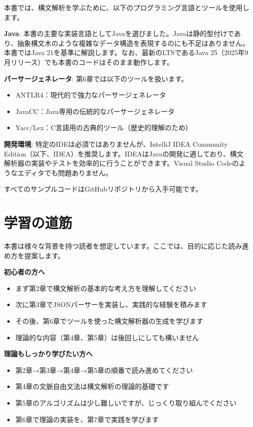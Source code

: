 本書では、構文解析を学ぶために、以下のプログラミング言語とツールを使用します。

\textbf{Java}:
本書の主要な実装言語としてJavaを選びました。Javaは静的型付けであり、抽象構文木のような複雑なデータ構造を表現するのにも不足はありません。本書ではJava
21を基準に解説します。なお、最新のLTSであるJava
25（2025年9月リリース）でも本書のコードはそのまま動作します。

\textbf{パーサージェネレータ}: 第6章では以下のツールを扱います。

\begin{itemize}
\tightlist
\item
  ANTLR4：現代的で強力なパーサージェネレータ
\item
  JavaCC：Java専用の伝統的なパーサージェネレータ
\item
  Yacc/Lex：C言語用の古典的ツール（歴史的理解のため）
\end{itemize}

\textbf{開発環境}: 特定のIDEは必須ではありませんが、IntelliJ IDEA
Community Edition（以下、IDEA）を推奨します。IDEAはJavaの開発に適しており、構文解析器の実装やテストを効率的に行うことができます。Visual Studio Codeのようなエディタでも問題ありません。

すべてのサンプルコードはGitHubリポジトリから入手可能です。

\hypertarget{chapter1-ux5b66ux7fd2ux306eux9053ux7b4b}{%
\section{学習の道筋}\label{chapter1-ux5b66ux7fd2ux306eux9053ux7b4b}}

本書は様々な背景を持つ読者を想定しています。ここでは、目的に応じた読み進め方を提案します。

\textbf{初心者の方へ}

\begin{itemize}
\tightlist
\item
  まず第2章で構文解析の基本的な考え方を理解してください
\item
  次に第3章でJSONパーサーを実装し、実践的な経験を積みます
\item
  その後、第6章でツールを使った構文解析器の生成を学びます
\item
  理論的な内容（第4章、第5章）は後回しにしても構いません
\end{itemize}

\textbf{理論もしっかり学びたい方へ}

\begin{itemize}
\tightlist
\item
  第2章→第3章→第4章→第5章の順番で読み進めてください
\item
  第4章の文脈自由文法は構文解析の理論的基礎です
\item
  第5章のアルゴリズムは少し難しいですが、じっくり取り組んでください
\item
  第6章で理論の実装を、第7章で実践を学びます
\end{itemize}


